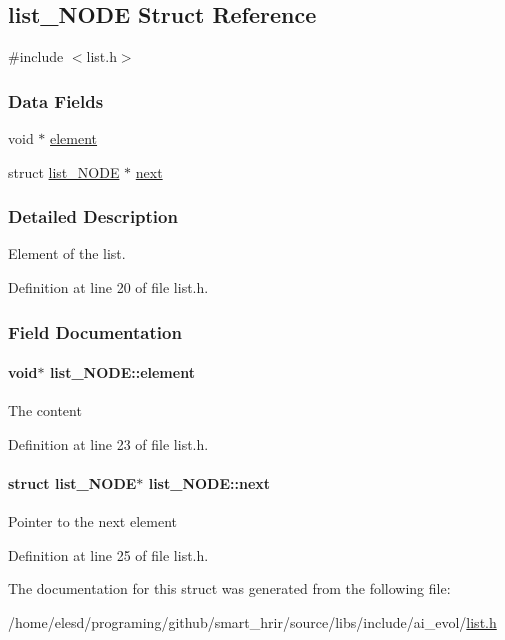 \hypertarget{a00005}{\subsection{list\-\_\-\-N\-O\-D\-E Struct Reference}
\label{a00005}
}


{\ttfamily \#include $<$list.\-h$>$}

\subsubsection*{Data Fields}
\begin{DoxyCompactItemize}
\item 
void $\ast$ \hyperlink{a00005_a1141f4bdc9d2c161c74369e806bc7aa4}{element}
\item 
struct \hyperlink{a00005}{list\-\_\-\-N\-O\-D\-E} $\ast$ \hyperlink{a00005_a76afef1241a7a495df545780c6940854}{next}
\end{DoxyCompactItemize}


\subsubsection{Detailed Description}
Element of the list. 

Definition at line 20 of file list.\-h.



\subsubsection{Field Documentation}
\hypertarget{a00005_a1141f4bdc9d2c161c74369e806bc7aa4}{
\paragraph[{element}]{\setlength{\rightskip}{0pt plus 5cm}void$\ast$ list\-\_\-\-N\-O\-D\-E\-::element}}\label{a00005_a1141f4bdc9d2c161c74369e806bc7aa4}
The content 

Definition at line 23 of file list.\-h.

\hypertarget{a00005_a76afef1241a7a495df545780c6940854}{
\paragraph[{next}]{\setlength{\rightskip}{0pt plus 5cm}struct {\bf list\-\_\-\-N\-O\-D\-E}$\ast$ list\-\_\-\-N\-O\-D\-E\-::next}}\label{a00005_a76afef1241a7a495df545780c6940854}
Pointer to the next element 

Definition at line 25 of file list.\-h.



The documentation for this struct was generated from the following file\-:\begin{DoxyCompactItemize}
\item 
/home/elesd/programing/github/smart\-\_\-hrir/source/libs/include/ai\-\_\-evol/\hyperlink{a00010}{list.\-h}\end{DoxyCompactItemize}

